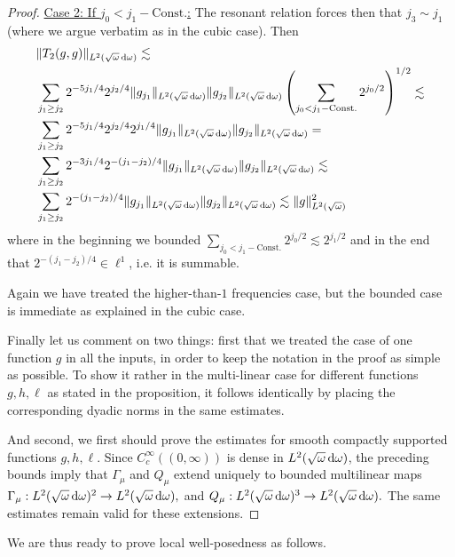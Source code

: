 \documentclass[reqno,11pt,letterpaper]{amsart}
\numberwithin{equation}{section}
\newcommand{\dd}{\, {\rm d}}
\begin{document}
\begin{proof}
\noindent
  \underline{Case 2: If $j_0 < j_1 - \text{Const.}$:} The resonant relation forces then that $j_3 \sim j_1$ (where we argue verbatim as in the cubic case). 
        Then \begin{align*}
           &\|T_2(g,g) \|_{L^2(\sqrt{\omega}\dd\omega)}\lesssim \\
& \sum_{j_1\geq j_2} 2^{-5j_1/4}2^{j_2/4}\|g_{j_1}\|_{L^2(\sqrt{\omega}\dd\omega)} \|g_{j_2}\|_{L^2(\sqrt{\omega}\dd\omega)} \left(\sum_{j_0<j_1 - \text{Const.}}  2^{j_0/2}\right)^{1/2} \lesssim  \\
& \sum_{j_1\geq j_2} 2^{-5j_1/4}2^{j_2/4}2^{j_1/4}\|g_{j_1}\|_{L^2(\sqrt{\omega}\dd\omega)} \|g_{j_2}\|_{L^2(\sqrt{\omega}\dd\omega)}=\\
& 
\sum_{j_1\geq j_2} 2^{-3j_1/4}2^{-(j_1-j_2)/4} \|g_{j_1}\|_{L^2(\sqrt{\omega}\dd\omega)} \|g_{j_2}\|_{L^2(\sqrt{\omega}\dd\omega)} 
\lesssim
\\ &  
\sum_{j_1\geq j_2} 2^{-(j_1-j_2)/4} \|g_{j_1}\|_{L^2(\sqrt{\omega}\dd\omega)} \|g_{j_2}\|_{L^2(\sqrt{\omega}\dd\omega)}  \lesssim \|g\|_{L^2(\sqrt{\omega})}^2
\end{align*}
where in the beginning we bounded $\sum_{j_0<j_1 - \text{Const.}}  2^{j_0/2}\lesssim 2^{j_1/2}$ and in the end that $2^{-(j_1-j_2)/4} \in \ell^1$, i.e. it is summable.

Again we have treated the higher-than-$1$ frequencies case, but the bounded case is immediate as explained in the cubic case. 

Finally let us comment on two things: first that we treated the case of one function $g$ in all the inputs, in order to keep the notation in the proof as simple as possible. To show it rather in the multi-linear case for different functions $g, h, \ell$ as stated in the proposition, it follows identically by placing the corresponding dyadic norms in the same estimates. 

And second, we first should prove the estimates for smooth compactly supported functions $g,h,\ell$. Since $C_c^\infty((0,\infty))$ is dense in $L^2(\sqrt{\omega}\dd\omega)$, the preceding bounds imply that $\Gamma_\mu$ and $Q_\mu$ extend uniquely to bounded multilinear maps
$ \Gamma_\mu: L^2(\sqrt{\omega}\dd\omega)^2
\to L^2(\sqrt{\omega}\dd\omega),
$
and
$Q_\mu: L^2(\sqrt{\omega}\dd\omega)^3
\to L^2(\sqrt{\omega}\dd\omega).$
The same estimates remain valid for these extensions. 
\end{proof}
We are thus ready to prove local well-posedness as follows. 
\end{document}
